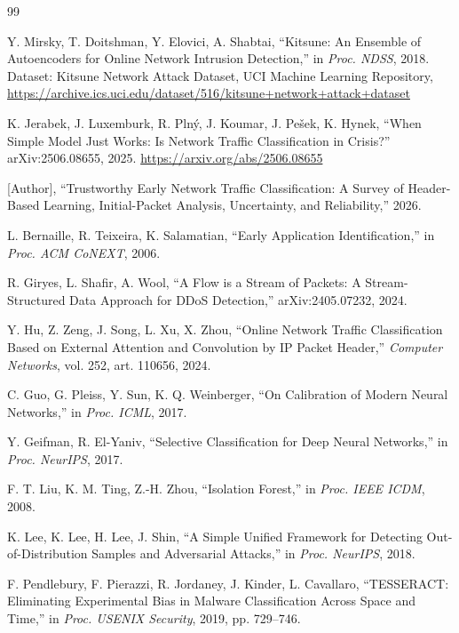 \documentclass[11pt]{article}
\begin{document}
{\small
\begin{thebibliography}{99}

 Y. Mirsky, T. Doitshman, Y. Elovici, A. Shabtai, ``Kitsune: An Ensemble of Autoencoders for Online Network Intrusion Detection,'' in \emph{Proc. NDSS}, 2018. Dataset: Kitsune Network Attack Dataset, UCI Machine Learning Repository, \url{https://archive.ics.uci.edu/dataset/516/kitsune+network+attack+dataset}

 K. Jerabek, J. Luxemburk, R. Plný, J. Koumar, J. Pešek, K. Hynek, ``When Simple Model Just Works: Is Network Traffic Classification in Crisis?'' arXiv:2506.08655, 2025. \url{https://arxiv.org/abs/2506.08655}

 [Author], ``Trustworthy Early Network Traffic Classification: A Survey of Header-Based Learning, Initial-Packet Analysis, Uncertainty, and Reliability,'' 2026.

 L. Bernaille, R. Teixeira, K. Salamatian, ``Early Application Identification,'' in \emph{Proc. ACM CoNEXT}, 2006.

 R. Giryes, L. Shafir, A. Wool, ``A Flow is a Stream of Packets: A Stream-Structured Data Approach for DDoS Detection,'' arXiv:2405.07232, 2024.

 Y. Hu, Z. Zeng, J. Song, L. Xu, X. Zhou, ``Online Network Traffic Classification Based on External Attention and Convolution by IP Packet Header,'' \emph{Computer Networks}, vol. 252, art. 110656, 2024.

 C. Guo, G. Pleiss, Y. Sun, K. Q. Weinberger, ``On Calibration of Modern Neural Networks,'' in \emph{Proc. ICML}, 2017.

 Y. Geifman, R. El-Yaniv, ``Selective Classification for Deep Neural Networks,'' in \emph{Proc. NeurIPS}, 2017.

 F. T. Liu, K. M. Ting, Z.-H. Zhou, ``Isolation Forest,'' in \emph{Proc. IEEE ICDM}, 2008.

 K. Lee, K. Lee, H. Lee, J. Shin, ``A Simple Unified Framework for Detecting Out-of-Distribution Samples and Adversarial Attacks,'' in \emph{Proc. NeurIPS}, 2018.

 F. Pendlebury, F. Pierazzi, R. Jordaney, J. Kinder, L. Cavallaro, ``TESSERACT: Eliminating Experimental Bias in Malware Classification Across Space and Time,'' in \emph{Proc. USENIX Security}, 2019, pp. 729--746.

\end{thebibliography}
}
\end{document}
